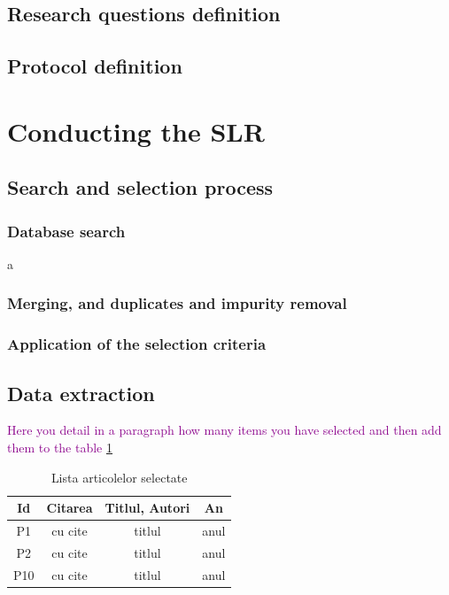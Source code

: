\documentclass[a4paper,fleqn]{cas-dc}
\begin{document}
\subsection{Research questions definition}

\subsection{Protocol definition}


\section{Conducting the SLR}
\subsection{Search and selection process}
\subsubsection{Database search}
a
\subsubsection{Merging, and duplicates and impurity removal}
\subsubsection{Application of the selection criteria}    

\subsection{Data extraction}

\textcolor{darkmagenta}{Here you detail in a paragraph how many items you have selected and then add them to the table  \ref{TabelArticoleSelectate}}

\begin{table}[htbp]
    \begin{center}
    \begin{tabular}{ |c|c|c|c| } 
    \hline
    \textbf{Id} & \textbf{Citarea} & \textbf{Titlul, Autori} & \textbf{An} \\
    \hline
    P1 & cu cite & titlul & anul \\
    \hline
    P2 & cu cite & titlul & anul \\
    \hline
    P10 & cu cite & titlul & anul \\
    \hline
    \end{tabular}
    \end{center}
   \caption{Lista articolelor selectate }
    \label{TabelArticoleSelectate}
\end{table}
\end{document}
